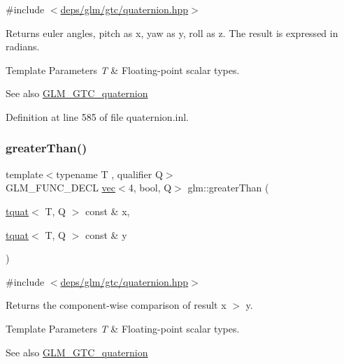 {\ttfamily \#include $<$\hyperlink{gtc_2quaternion_8hpp}{deps/glm/gtc/quaternion.\+hpp}$>$}

Returns euler angles, pitch as x, yaw as y, roll as z. The result is expressed in radians.


\begin{DoxyTemplParams}{Template Parameters}
{\em T} & Floating-\/point scalar types.\\
\hline
\end{DoxyTemplParams}
\begin{DoxySeeAlso}{See also}
\hyperlink{group__gtc__quaternion}{G\+L\+M\+\_\+\+G\+T\+C\+\_\+quaternion} 
\end{DoxySeeAlso}


Definition at line 585 of file quaternion.\+inl.

\mbox{\label{group__gtc__quaternion_ga3f2720e2d77ec39186415f85ecd9cad0}} 
\subsubsection{\texorpdfstring{greater\+Than()}{greaterThan()}}
{\footnotesize\ttfamily template$<$typename T , qualifier Q$>$ \\
G\+L\+M\+\_\+\+F\+U\+N\+C\+\_\+\+D\+E\+CL \hyperlink{structglm_1_1vec}{vec}$<$4, bool, Q$>$ glm\+::greater\+Than (\begin{DoxyParamCaption}\item[{\hyperlink{structglm_1_1tquat}{tquat}$<$ T, Q $>$ const \&}]{x,  }\item[{\hyperlink{structglm_1_1tquat}{tquat}$<$ T, Q $>$ const \&}]{y }\end{DoxyParamCaption})}



{\ttfamily \#include $<$\hyperlink{gtc_2quaternion_8hpp}{deps/glm/gtc/quaternion.\+hpp}$>$}

Returns the component-\/wise comparison of result x $>$ y.


\begin{DoxyTemplParams}{Template Parameters}
{\em T} & Floating-\/point scalar types.\\
\hline
\end{DoxyTemplParams}
\begin{DoxySeeAlso}{See also}
\hyperlink{group__gtc__quaternion}{G\+L\+M\+\_\+\+G\+T\+C\+\_\+quaternion} 
\end{DoxySeeAlso}


